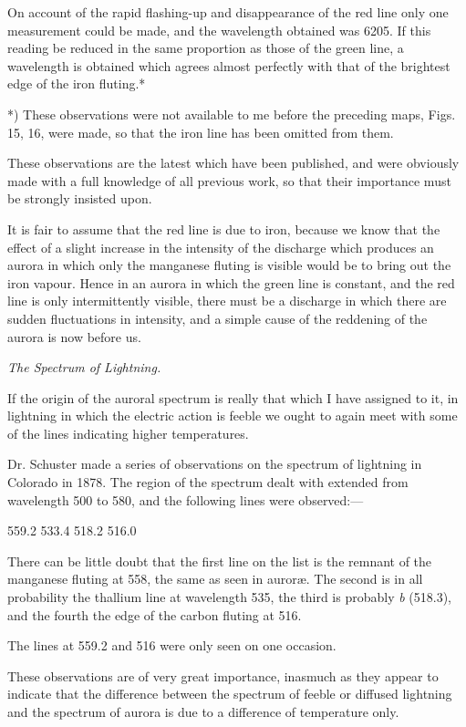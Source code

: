 \documentclass[a4paper, 12pt, oneside, polutonikogreek, english]{article}
\begin{document}
On account of the rapid flashing-up and disappearance of the red line only one measurement could be made, and the wavelength obtained was 6205. If this reading be reduced in the same proportion as those of the green line, a wavelength is obtained which agrees almost perfectly with that of the brightest edge of the iron fluting.*

*) These observations were not available to me before the preceding maps, Figs. 15, 16, were made, so that the iron line has been omitted from them.

These observations are the latest which have been published, and were obviously made with a full knowledge of all previous work, so that their importance must be strongly insisted upon.

It is fair to assume that the red line is due to iron, because we know that the effect of a slight increase in the intensity of the discharge which produces an aurora in which only the manganese fluting is visible would be to bring out the iron vapour. Hence in an aurora in which the green line is constant, and the red line is only intermittently visible, there must be a discharge in which there are sudden fluctuations in intensity, and a simple cause of the reddening of the aurora is now before us.

\emph{The Spectrum of Lightning.}

If the origin of the auroral spectrum is really that which I have assigned to it, in lightning in which the electric action is feeble we ought to again meet with some of the lines indicating higher temperatures.

Dr. Schuster made a series of observations on the spectrum of lightning in Colorado in 1878. The region of the spectrum dealt with extended from wavelength 500 to 580, and the following lines were observed:---

559.2 
533.4 
518.2 
516.0 

There can be little doubt that the first line on the list is the remnant of the manganese fluting at 558, the same as seen in auroræ. The second is in all probability the thallium line at wavelength 535, the third is probably \emph{b} (518.3), and the fourth the edge of the carbon fluting at 516.

The lines at 559.2 and 516 were only seen on one occasion.

These observations are of very great importance, inasmuch as they appear to indicate that the difference between the spectrum of feeble or diffused lightning and the spectrum of aurora is due to a difference of temperature only.
\end{document}
